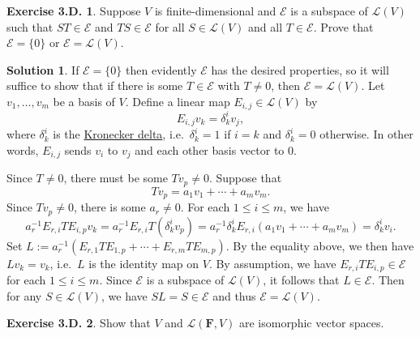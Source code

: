 \documentclass[12pt]{article}
\theoremstyle{definition}
\theoremstyle{exercise}
\newtheorem{exercise}{Exercise 3.D.}
\theoremstyle{solution}
\newtheorem*{solution}{Solution}
\newcommand{\lmap}{\mathcal{L}}
\newcommand{\F}{\mathbf{F}}
\begin{document}
\begin{exercise}
\label{ex:17}
    Suppose \( V \) is finite-dimensional and \( \mathcal{E} \) is a subspace of \( \lmap(V) \) such that \( ST \in \mathcal{E} \) and \( TS \in \mathcal{E} \) for all \( S \in \lmap(V) \) and all \( T \in \mathcal{E} \). Prove that \( \mathcal{E} = \{ 0 \} \) or \( \mathcal{E} = \lmap(V) \).
\end{exercise}

\begin{solution}
    If \( \mathcal{E} = \{ 0 \} \) then evidently \( \mathcal{E} \) has the desired properties, so it will suffice to show that if there is some \( T \in \mathcal{E} \) with \( T \neq 0 \), then \( \mathcal{E} = \lmap(V) \). Let \( v_1, \ldots, v_m \) be a basis of \( V \). Define a linear map \( E_{i,j} \in \lmap(V) \) by
    \[
        E_{i,j} v_k = \delta^i_k v_j,
    \]
    where \( \delta^i_k \) is the \href{https://en.wikipedia.org/wiki/Kronecker_delta}{Kronecker delta}, i.e.\ \( \delta^i_k = 1 \) if \( i = k \) and \( \delta^i_k = 0 \) otherwise. In other words, \( E_{i,j} \) sends \( v_i \) to \( v_j \) and each other basis vector to 0.
    
    Since \( T \neq 0 \), there must be some \( Tv_p \neq 0 \). Suppose that
    \[
        Tv_p = a_1 v_1 + \cdots + a_m v_m.
    \]
    Since \( Tv_p \neq 0 \), there is some \( a_r \neq 0 \). For each \( 1 \leq i \leq m \), we have
    \[
        a_r^{-1} E_{r,i} T E_{i,p} v_k = a_r^{-1} E_{r,i} T (\delta^i_k v_p) = a_r^{-1} \delta^i_k E_{r,i} (a_1 v_1 + \cdots + a_m v_m) = \delta^i_k v_i.
    \]
    Set \( L := a_r^{-1} (E_{r,1} T E_{1,p} + \cdots + E_{r,m} T E_{m,p}) \). By the equality above, we then have \( Lv_k = v_k \), i.e.\ \( L \) is the identity map on \( V \). By assumption, we have \( E_{r,i} T E_{i,p} \in \mathcal{E} \) for each \( 1 \leq i \leq m \). Since \( \mathcal{E} \) is a subspace of \( \lmap(V) \), it follows that \( L \in \mathcal{E} \). Then for any \( S \in \lmap(V) \), we have \( SL = S \in \mathcal{E} \) and thus \( \mathcal{E} = \lmap(V) \).
\end{solution}

\begin{exercise}
\label{ex:18}
    Show that \( V \) and \( \lmap(\F, V) \) are isomorphic vector spaces.
\end{exercise}
\end{document}
